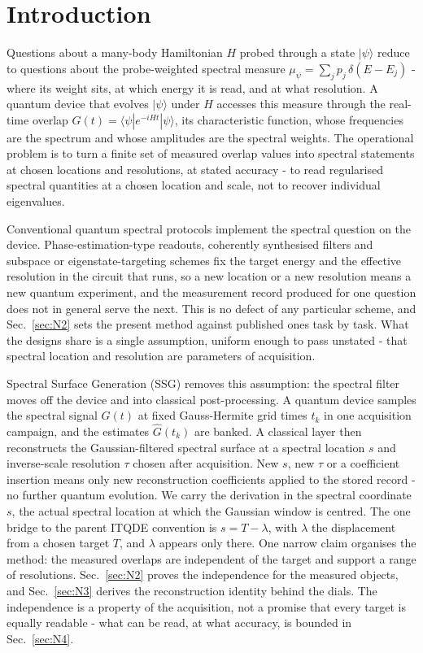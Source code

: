 \section{Introduction}\label{sec:N1}

Questions about a many-body Hamiltonian $H$ probed through a state $|\psi\rangle$ reduce to questions about the probe-weighted spectral measure $\mu_\psi = \sum_j p_j\,\delta(E - E_j)$ - where its weight sits, at which energy it is read, and at what resolution. A quantum device that evolves $|\psi\rangle$ under $H$ accesses this measure through the real-time overlap $G(t) = \langle\psi|e^{-iHt}|\psi\rangle$, its characteristic function, whose frequencies are the spectrum and whose amplitudes are the spectral weights. The operational problem is to turn a finite set of measured overlap values into spectral statements at chosen locations and resolutions, at stated accuracy - to read regularised spectral quantities at a chosen location and scale, not to recover individual eigenvalues.

Conventional quantum spectral protocols implement the spectral question on the device. Phase-estimation-type readouts, coherently synthesised filters and subspace or eigenstate-targeting schemes fix the target energy and the effective resolution in the circuit that runs, so a new location or a new resolution means a new quantum experiment, and the measurement record produced for one question does not in general serve the next. This is no defect of any particular scheme, and Sec.~\ref{sec:N2} sets the present method against published ones task by task. What the designs share is a single assumption, uniform enough to pass unstated - that spectral location and resolution are parameters of acquisition.

Spectral Surface Generation (SSG) removes this assumption: the spectral filter moves off the device and into classical post-processing. A quantum device samples the spectral signal $G(t)$ at fixed Gauss-Hermite grid times $t_k$ in one acquisition campaign, and the estimates $\hat{G}(t_k)$ are banked. A classical layer then reconstructs the Gaussian-filtered spectral surface at a spectral location $s$ and inverse-scale resolution $\tau$ chosen after acquisition. New $s$, new $\tau$ or a coefficient insertion means only new reconstruction coefficients applied to the stored record - no further quantum evolution. We carry the derivation in the spectral coordinate $s$, the actual spectral location at which the Gaussian window is centred. The one bridge to the parent ITQDE convention is $s = T - \lambda$, with $\lambda$ the displacement from a chosen target $T$, and $\lambda$ appears only there. One narrow claim organises the method: the measured overlaps are independent of the target and support a range of resolutions. Sec.~\ref{sec:N2} proves the independence for the measured objects, and Sec.~\ref{sec:N3} derives the reconstruction identity behind the dials. The independence is a property of the acquisition, not a promise that every target is equally readable - what can be read, at what accuracy, is bounded in Sec.~\ref{sec:N4}.

